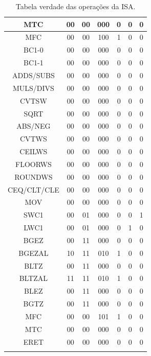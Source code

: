 \documentclass[12pt]{article}
\begin{document}
\begin{longtable}{|c|c|c|c|c|c|c|}
		MTC & 00 & 00 & 000 & 0 & 0 & 0\\\hline
		MFC & 00 & 00 & 100 & 1 & 0 & 0\\\hline
		BC1-0 & 00 & 00 & 000 & 0 & 0 & 0\\\hline	
		BC1-1 & 00 & 00 & 000 & 0 & 0 & 0\\\hline
		ADDS/SUBS & 00 & 00 & 000 & 0 & 0 & 0\\\hline
		MULS/DIVS & 00 & 00 & 000 & 0 & 0 & 0\\\hline
		CVTSW & 00 & 00 & 000 & 0 & 0 & 0\\\hline	
		SQRT & 00 & 00 & 000 & 0 & 0 & 0\\\hline
		ABS/NEG & 00 & 00 & 000 & 0 & 0 & 0\\\hline
		CVTWS & 00 & 00 & 000 & 0 & 0 & 0\\\hline
		CEILWS & 00 & 00 & 000 & 0 & 0 & 0\\\hline
		FLOORWS & 00 & 00 & 000 & 0 & 0 & 0\\\hline
		ROUNDWS & 00 & 00 & 000 & 0 & 0 & 0\\\hline	
		CEQ/CLT/CLE & 00 & 00 & 000 & 0 & 0 & 0\\\hline
		MOV & 00 & 00 & 000 & 0 & 0 & 0\\\hline
		SWC1 & 00 & 01 & 000 & 0 & 0 & 1\\\hline	
		LWC1 & 00 & 01 & 000 & 0 & 1 & 0\\\hline
		BGEZ & 00 & 11 & 000 & 0 & 0 & 0\\\hline	
		BGEZAL & 10 & 11 & 010 & 1 & 0 & 0\\\hline
		BLTZ & 00 & 11 & 000 & 0 & 0 & 0\\\hline
		BLTZAL & 11 & 11 & 010 & 1 & 0 & 0\\\hline
		BLEZ & 00 & 11 & 000 & 0 & 0 & 0\\\hline
		BGTZ & 00 & 11 & 000 & 0 & 0 & 0\\\hline
		MFC & 00 & 00 & 101 & 1 & 0 & 0\\\hline	
		MTC & 00 & 00 & 000 & 0 & 0 & 0\\\hline
		ERET & 00 & 00 & 000 & 0 & 0 & 0\\\hline			
	\caption{Tabela verdade das operações da ISA.}
	\label{tab:req22}
\end{longtable}
\end{document}
